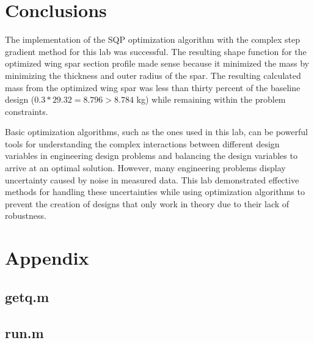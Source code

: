 \documentclass[11pt]{article}%
\begin{document}
\section{Conclusions}
The implementation of the SQP optimization algorithm with the complex step gradient method for this lab was successful. The resulting shape function for the optimized wing spar section profile made sense because it minimized the mass by minimizing the thickness and outer radius of the spar. The resulting calculated mass from the optimized wing spar was less than thirty percent of the baseline design ($0.3*29.32=8.796 > 8.784 $ kg) while remaining within the problem constraints. 

 Basic optimization algorithms, such as the ones used in this lab, can be powerful tools for understanding the complex interactions between different design variables in engineering design problems and balancing the design variables to arrive at an optimal solution. However, many engineering problems display uncertainty caused by noise in measured data. This lab demonstrated effective methods for handling these uncertainties while using optimization algorithms to prevent the creation of designs that only work in theory due to their lack of robustness. 

\printbibliography
\newpage
\section{Appendix}

\subsection{getq.m}
\label{sec:getq}

\newpage
\subsection{run.m}
\label{sec:run}

\newpage
\end{document}
